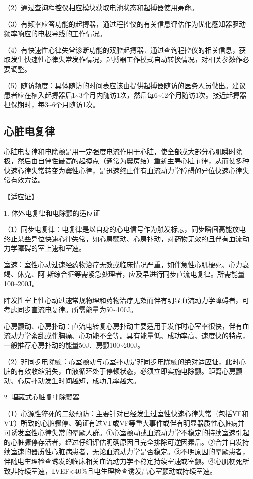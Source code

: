 （2）通过查询程控仪相应模块获取电池状态和起搏器使用寿命。

（3）有频率应答功能的起搏器，通过程控仪的有关信息评估作为优化感知器驱动频率响应的电极导线的工作情况。

（4）有快速性心律失常诊断功能的双腔起搏器，通过查询程控仪的相关信息，获取发生快速性心律失常发作情况，起搏器工作模式自动转换情况，对相关参数作必要调整。

（5）随访频度：具体随访的时间表应该由提供起搏器随访的医务人员做出。建议患者应在植入起搏器后1\textasciitilde{}3个月内随访1次，然后每6\textasciitilde{}12个月随访1次。接近起搏器担保期时，每3\textasciitilde{}6个月随访1次。

\subsection{心脏电复律}

心脏电复律和电除颤是用一定强度电流作用于心脏，使全部或大部分心肌瞬时除极，然后由自律性最高的起搏点（通常为窦房结）重新主导心脏节律，从而使多种快速心律失常转变为窦性心律，是迅速终止伴有血流动力学障碍的异位快速心律失常有效方法。

【适应证】

1. 体外电复律和电除颤的适应证

（1）同步电复律：电复律是以自身的心电信号作为触发标志，同步瞬间高能放电终止某些异位快速心律失常，如心房颤动、心房扑动，对药物无效的且伴有血流动力学障碍的室上速和室速。

室速：室性心动过速经药物治疗无效或临床情况严重，如伴急性心肌梗死、心力衰竭、休克、阿-斯综合征等需紧急处理者，应及早进行同步直流电复律。所需能量100\textasciitilde{}200J。

阵发性室上性心动过速常规物理和药物治疗无效而伴有明显血流动力学障碍者，可考虑同步直流电复律。所需能量为50\textasciitilde{}100J。

心房颤动、心房扑动：直流电转复心房扑动主要适用于发作时心室率很快，伴有血流动力学紊乱或伴胸痛、心功能不全等。具有能量低、成功率高、速度快的特点，一般推荐心房扑动的能量50J、房颤100\textasciitilde{}200J。

（2）非同步电除颤：心室颤动与心室扑动是非同步电除颤的绝对适应证，此时心脏的有效收缩消失，血液循环处于停顿状态，必须立即实施电除颤。距离心房颤动、心房扑动发生时间越短，成功几率越大。

2. 埋藏式心脏复律除颤器

（1）心源性猝死的二级预防：主要针对已经发生过室性快速心律失常（包括VF和VT）所致的心脏骤停、确证有过VT或VF等重大事件或伴有明显器质性心脏病并可诱发室性心律失常的晕厥人群。①心室颤动或血流动力学不稳定的持续室速引起的心脏骤停存活者，经过仔细评估明确原因且完全排除可逆因素后。②合并自发持续室速的器质性心脏病患者，无论血流动力学是否稳定。③不明原因的晕厥患者，伴随电生理检查诱发的临床相关血流动力学不稳定持续室速或室颤。④心肌梗死所致非持续室速，LVEF\textless{}40\%且电生理检查诱发出心室颤动或持续室速。

